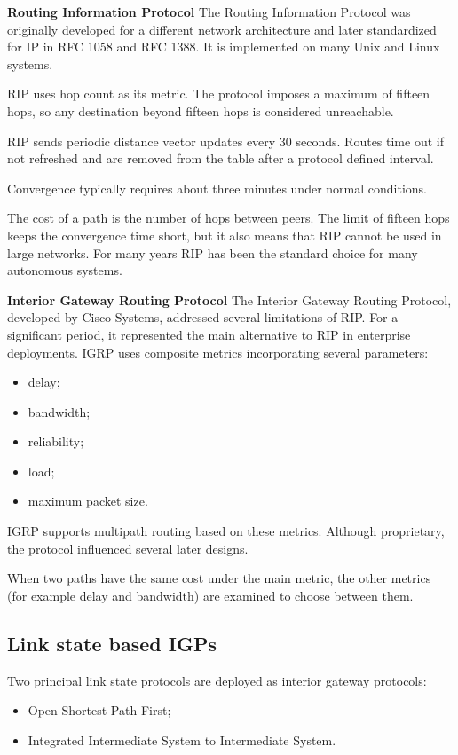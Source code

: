 \documentclass[11pt,a4paper,openany]{report}
\begin{document}
\textbf{Routing Information Protocol} The Routing Information Protocol was originally developed for a different network architecture and later standardized for IP in RFC 1058 and RFC 1388. It is implemented on many Unix and Linux systems.

RIP uses hop count as its metric. The protocol imposes a maximum of fifteen hops, so any destination beyond fifteen hops is considered unreachable.

RIP sends periodic distance vector updates every 30 seconds. Routes time out if not refreshed and are removed from the table after a protocol defined interval.

Convergence typically requires about three minutes under normal conditions.

The cost of a path is the number of hops between peers. The limit of fifteen hops
keeps the convergence time short, but it also means that RIP cannot be used in
large networks. For many years RIP has been the standard choice for many
autonomous systems.

\textbf{Interior Gateway Routing Protocol} The Interior Gateway Routing Protocol, developed by Cisco Systems, addressed several limitations of RIP. For a significant period, it represented the main alternative to RIP in enterprise deployments. IGRP uses composite metrics incorporating several parameters:

\begin{itemize}
\item delay;
\item bandwidth;
\item reliability;
\item load;
\item maximum packet size.
\end{itemize}

IGRP supports multipath routing based on these metrics. Although proprietary, the protocol influenced several later designs.

When two paths have the same cost under the main metric, the other metrics
(for example delay and bandwidth) are examined to choose between them.

\subsection{Link state based IGPs}

Two principal link state protocols are deployed as interior gateway protocols:

\begin{itemize}
\item Open Shortest Path First;
\item Integrated Intermediate System to Intermediate System.
\end{itemize}
\end{document}
